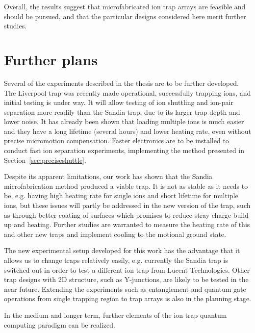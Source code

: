 Overall, the results suggest that microfabricated ion trap arrays are feasible and should be pursued, and that the particular designs considered here merit further studies.

\section{Further plans}
\label{sec:plans}

Several of the experiments described in the thesis are to be further developed. The Liverpool trap was recently made operational, successfully trapping ions, and initial testing is under way. It will allow testing of ion shuttling and ion-pair separation more readily than the Sandia trap, due to its larger trap depth and lower noise. It has already been shown that loading multiple ions is much easier and they have a long lifetime (several hours) and lower heating rate, even without precise micromotion compensation. Faster electronics are to be installed to conduct fast ion separation experiments, implementing the method presented in Section~\ref{sec:preciseshuttle}.

Despite its apparent limitations, our work has shown that the Sandia microfabrication method produced a viable trap. It is not as stable as it needs to be, e.g. having high heating rate for single ions and short lifetime for multiple ions, but these issues will partly be addressed in the new version of the trap, such as through better coating of surfaces which promises to reduce stray charge build-up and heating. Further studies are warranted to measure the heating rate of this and other new traps and implement cooling to the motional ground state. 

The new experimental setup developed for this work has the advantage that it allows us to change traps relatively easily, e.g. currently the Sandia trap is switched out in order to test a different ion trap from Lucent Technologies. Other trap designs with 2D structure, such as Y-junctions, are likely to be tested in the near future. Extending the experiments such as entanglement and quantum gate operations from single trapping region to trap arrays is also in the planning stage.

In the medium and longer term, further elements of the ion trap quantum computing paradigm can be realized.

